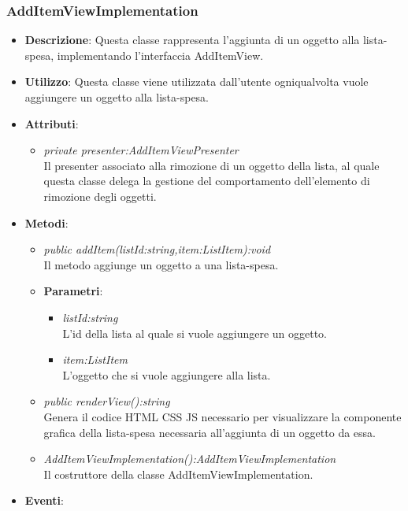 \subsubsection{AddItemViewImplementation}
\begin{itemize}
\item \textbf{Descrizione}: Questa classe rappresenta l'aggiunta di un oggetto alla lista-spesa, implementando l'interfaccia AddItemView.
\item \textbf{Utilizzo}: Questa classe viene utilizzata dall'utente ogniqualvolta vuole aggiungere un oggetto alla lista-spesa.
\item \textbf{Attributi}: 
	\begin{itemize}
	\item \textit{private presenter:AddItemViewPresenter}\\
	Il presenter associato alla rimozione di un oggetto della lista, al quale questa classe delega la gestione del comportamento dell'elemento di rimozione degli oggetti.
	\end{itemize}
\item \textbf{Metodi}:
	\begin{itemize}
	\item \textit{public addItem(listId:string,item:ListItem):void}\\
	Il metodo aggiunge un oggetto a una lista-spesa.
			\item{\textbf{Parametri}: \begin{itemize}
			\item \textit{listId:string}\\
			L'id della lista al quale si vuole aggiungere un oggetto.
			\item \textit{item:ListItem}\\
			L'oggetto che si vuole aggiungere alla lista.
			\end{itemize}}
	\item \textit{public renderView():string}\\
	Genera il codice HTML CSS JS necessario per visualizzare la componente grafica della lista-spesa necessaria all'aggiunta di un oggetto da essa.
	\item \textit{AddItemViewImplementation():AddItemViewImplementation}\\
	Il costruttore della classe AddItemViewImplementation.
	\end{itemize}
\item \textbf{Eventi}:
\end{itemize}

